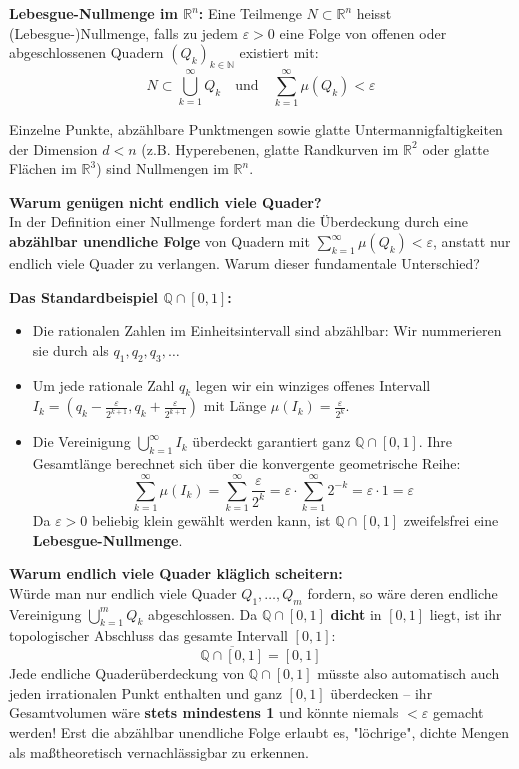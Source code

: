 \begin{definition}
    \textbf{Lebesgue-Nullmenge im $\mathbb{R}^n$:}
    Eine Teilmenge $N \subset \mathbb{R}^n$ heisst (Lebesgue-)Nullmenge, falls zu jedem $\varepsilon > 0$ eine Folge von offenen oder abgeschlossenen Quadern $(Q_k)_{k \in \mathbb{N}}$ existiert mit:
    $$ N \subset \bigcup_{k=1}^\infty Q_k \quad \text{und} \quad \sum_{k=1}^\infty \mu(Q_k) < \varepsilon $$
\end{definition}

\begin{example}
    Einzelne Punkte, abzählbare Punktmengen sowie glatte Untermannigfaltigkeiten der Dimension $d < n$ (z.B. Hyperebenen, glatte Randkurven im $\mathbb{R}^2$ oder glatte Flächen im $\mathbb{R}^3$) sind Nullmengen im $\mathbb{R}^n$.
\end{example}

\begin{remark}
    \textbf{Warum genügen nicht endlich viele Quader?} \\
    In der Definition einer Nullmenge fordert man die Überdeckung durch eine \textbf{abzählbar unendliche Folge} von Quadern mit $\sum_{k=1}^\infty \mu(Q_k) < \varepsilon$, anstatt nur endlich viele Quader zu verlangen. Warum dieser fundamentale Unterschied?

    \textbf{Das Standardbeispiel $\mathbb{Q} \cap [0, 1]$:}
    \begin{itemize}
        \item Die rationalen Zahlen im Einheitsintervall sind abzählbar: Wir nummerieren sie durch als $q_1, q_2, q_3, \dots$
        \item Um jede rationale Zahl $q_k$ legen wir ein winziges offenes Intervall $I_k = \left( q_k - \frac{\varepsilon}{2^{k+1}}, q_k + \frac{\varepsilon}{2^{k+1}} \right)$ mit Länge $\mu(I_k) = \frac{\varepsilon}{2^k}$.
        \item Die Vereinigung $\bigcup_{k=1}^\infty I_k$ überdeckt garantiert ganz $\mathbb{Q} \cap [0, 1]$. Ihre Gesamtlänge berechnet sich über die konvergente geometrische Reihe:
        $$ \sum_{k=1}^\infty \mu(I_k) = \sum_{k=1}^\infty \frac{\varepsilon}{2^k} = \varepsilon \cdot \sum_{k=1}^\infty 2^{-k} = \varepsilon \cdot 1 = \varepsilon $$
        Da $\varepsilon > 0$ beliebig klein gewählt werden kann, ist $\mathbb{Q} \cap [0, 1]$ zweifelsfrei eine \textbf{Lebesgue-Nullmenge}.
    \end{itemize}
    \textbf{Warum endlich viele Quader kläglich scheitern:} \\
    Würde man nur endlich viele Quader $Q_1, \dots, Q_m$ fordern, so wäre deren endliche Vereinigung $\bigcup_{k=1}^m Q_k$ abgeschlossen. Da $\mathbb{Q} \cap [0, 1]$ \textbf{dicht} in $[0, 1]$ liegt, ist ihr topologischer Abschluss das gesamte Intervall $[0, 1]$:
    $$ \overline{\mathbb{Q} \cap [0, 1]} = [0, 1] $$
    Jede endliche Quaderüberdeckung von $\mathbb{Q} \cap [0, 1]$ müsste also automatisch auch jeden irrationalen Punkt enthalten und ganz $[0, 1]$ überdecken – ihr Gesamtvolumen wäre \textbf{stets mindestens 1} und könnte niemals $< \varepsilon$ gemacht werden! Erst die abzählbar unendliche Folge erlaubt es, "löchrige", dichte Mengen als maßtheoretisch vernachlässigbar zu erkennen.
\end{remark}

